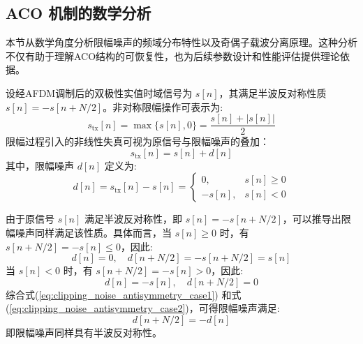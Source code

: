 \subsection{ACO 机制的数学分析}
\label{subsec:aco_mechanism_analysis}

本节从数学角度分析限幅噪声的频域分布特性以及奇偶子载波分离原理。这种分析不仅有助于理解ACO结构的可恢复性，也为后续参数设计和性能评估提供理论依据。


设经AFDM调制后的双极性实值时域信号为 $s[n]$，其满足半波反对称性质 $s[n] = -s[n+N/2]$。非对称限幅操作可表示为:
\begin{equation}
    s_{\mathrm{tx}}[n] = \max\{s[n], 0\} = \frac{s[n] + |s[n]|}{2}
    \label{eq:clipping_operation}
\end{equation}
限幅过程引入的非线性失真可视为原信号与限幅噪声的叠加：
\begin{equation}
    s_{\mathrm{tx}}[n] = s[n] + d[n]
    \label{eq:signal_plus_clipping_noise}
\end{equation}
其中，限幅噪声 $d[n]$ 定义为:
\begin{equation}
    d[n] = s_{\mathrm{tx}}[n] - s[n] = \begin{cases}
        0, & s[n] \geq 0 \\
        -s[n], & s[n] < 0
    \end{cases}
    \label{eq:clipping_noise_definition}
\end{equation}

由于原信号 $s[n]$ 满足半波反对称性，即 $s[n] = -s[n+N/2]$，可以推导出限幅噪声同样满足该性质。具体而言，当 $s[n] \geq 0$ 时，有 $s[n+N/2] = -s[n] \leq 0$，因此:
\begin{equation}
    d[n] = 0, \quad d[n+N/2] = -s[n+N/2] = s[n]
    \label{eq:clipping_noise_antisymmetry_case1}
\end{equation}
当 $s[n] < 0$ 时，有 $s[n+N/2] = -s[n] > 0$，因此:
\begin{equation}
    d[n] = -s[n], \quad d[n+N/2] = 0
    \label{eq:clipping_noise_antisymmetry_case2}
\end{equation}
综合式(\ref{eq:clipping_noise_antisymmetry_case1}) 和式(\ref{eq:clipping_noise_antisymmetry_case2})，可得限幅噪声满足:
\begin{equation}
    d[n+N/2] = -d[n]
    \label{eq:clipping_noise_antisymmetry}
\end{equation}
即限幅噪声同样具有半波反对称性。

